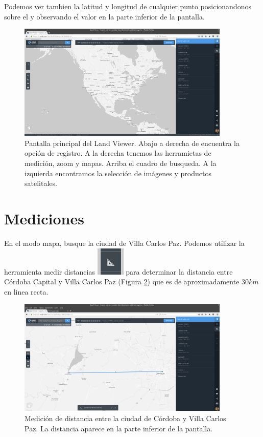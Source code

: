 \documentclass[a4paper,12pt]{book}
\begin{document}
Podemos ver tambien la latitud y longitud de cualquier punto posicionandonos sobre el y observando el valor en la parte inferior de la pantalla.

\begin{figure}[h!]
    \centering
    \includegraphics[width=0.9\textwidth]{fig:main.png}
    \caption{Pantalla principal del Land Viewer. Abajo a derecha de encuentra la opción de registro. A la derecha tenemos las herramietas de medición, zoom y mapas. Arriba el cuadro de busqueda. A la izquierda encontramos la selección de imágenes y productos satelitales.}
    \label{fig:main}
\end{figure}


\section{Mediciones}

En el modo mapa, busque la ciudad de Villa Carlos Paz. Podemos utilizar la herramienta medir distancias \includegraphics[scale=0.2]{in:medir.png} para determinar la distancia entre Córdoba Capital y Villa Carlos Paz (Figura \ref{fig:distancia}) que es de aproximadamente $30km$ en linea recta.

\begin{figure}[!h]
    \centering
    \includegraphics[width=0.9\textwidth]{fig:distancia.png}
    \caption{Medición de distancia entre la ciudad de Córdoba y Villa Carlos Paz. La distancia aparece en la parte inferior de la pantalla.}
    \label{fig:distancia}
\end{figure}
\end{document}
